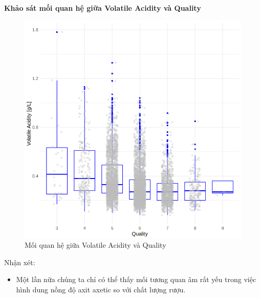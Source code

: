 \textbf{Khảo sát mối quan hệ giữa Volatile Acidity và Quality}
\begin{figure}[H]
    \centering
    \includegraphics[width=0.75\columnwidth]{wine_colors/wine_volatile_acidity_quality.png}
    \caption{Mối quan hệ giữa Volatile Acidity và Quality}
    \label{fig:wine_volatile_acidity_quality}
\end{figure}
Nhận xét:
\begin{itemize}
    \item Một lần nữa chúng ta chỉ có thể thấy mối tương quan âm rất yếu trong việc hình dung nồng độ axit axetic so với chất lượng rượu.
\end{itemize}

